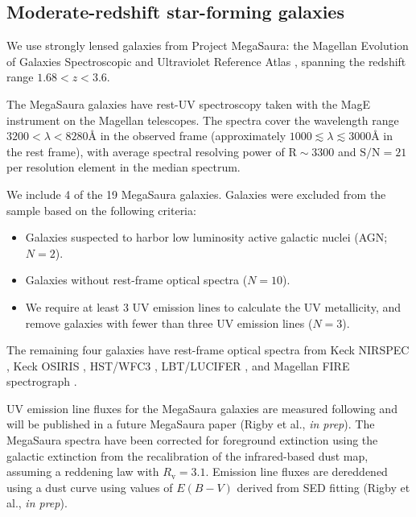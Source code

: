 \documentclass[preprint2]{aastex62}
\newcommand{\ang}{\ensuremath{\mbox{\AA}}\xspace}
\newcommand{\mage}{{\sc Meg}a{\sc S}a{\sc ura}\xspace}
\newcommand{\SN}{\ensuremath{\mathrm{S}/\mathrm{N}}\xspace}
\begin{document}
\subsection{Moderate-redshift star-forming galaxies}\label{sec:data:mage}

We use strongly lensed galaxies from Project \mage: the Magellan Evolution of Galaxies Spectroscopic and Ultraviolet Reference Atlas \citep{Rigby+2018a, Rigby+2018b}, spanning the redshift range $1.68 < z < 3.6$.

The \mage galaxies have rest-UV spectroscopy taken with the MagE instrument on the Magellan telescopes. The spectra cover the wavelength range $3200 < \lambda < 8280$\ang in the observed frame (approximately $1000 \lesssim \lambda \lesssim 3000$\ang in the rest frame), with average spectral resolving power of $\mathrm{R}\sim3300$ and $\SN=21$ per resolution element in the median spectrum.

We include 4 of the 19 \mage galaxies. Galaxies were excluded from the sample based on the following criteria: 
\begin{itemize}
    \item Galaxies suspected to harbor low luminosity active galactic nuclei (AGN; $N=2$).%
    \item Galaxies without rest-frame optical spectra ($N=10$). 
    \item We require at least 3 UV emission lines to calculate the UV metallicity, and remove galaxies with fewer than three UV emission lines ($N=3$).
\end{itemize}

The remaining four galaxies have rest-frame optical spectra from Keck NIRSPEC \citep{Rigby+2011, Wuyts+2012a}, Keck OSIRIS \citep{Wuyts+2014}, HST/WFC3 \citep{Whitaker+2014}, LBT/LUCIFER \citep{Bian+2010}, and Magellan FIRE spectrograph \citep{Rivera+2017}. 

UV emission line fluxes for the \mage galaxies are measured following \citet{Acharyya+2019} and will be published in a future \mage paper (Rigby et al., \emph{in prep}). The \mage spectra have been corrected for foreground extinction using the galactic extinction from the \citet{Schlafly+2011} recalibration of the \citet{Schlegel+1998} infrared-based dust map, assuming a \citet{Fitzpatrick+1999} reddening law with $R_{\mathrm{v}} = 3.1$. Emission line fluxes are dereddened using a \citet{Cardelli+1989} dust curve using values of $E(B-V)$ derived from SED fitting (Rigby et al., \emph{in prep}).
\end{document}
